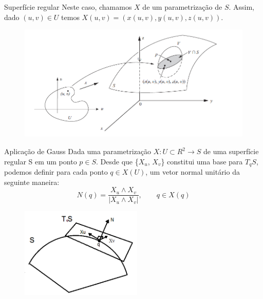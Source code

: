 \documentclass[blue]{beamer}
\begin{document}
\begin{frame}{Superfície regular}
\justify
\hspace{0.2cm}Neste caso, chamamos $X$ de um parametrização de $S$. Assim, dado $(u, v) \in U$ temos $X(u, v) = (x(u, v), y(u, v), z(u, v))$.
\begin{figure}[ht!]
	\centering
	\includegraphics[width=12cm]{img1.png}
\end{figure}
\end{frame}
%
%
%
\begin{frame}{Aplicação de Gauss} 
\justify
\hspace{0.2cm}Dada uma parametrização $X: U \subset R^2 \rightarrow S$ de uma superfície regular S em um ponto $p \in S$. Desde que \{$X_u$, $X_v$\} constitui uma base para $T_qS$, podemos definir para cada ponto $q \in X(U)$, um vetor normal unitário da seguinte maneira: 
$$
N(q)=\frac{X_u\wedge X_v}{|X_u\wedge X_v|}, \quad \quad q \in X(q) 
$$
\begin{figure}[ht!]
	\centering
	\includegraphics[width=5.8cm]{Img2.png}
	\end{figure}
\end{frame}
\end{document}
